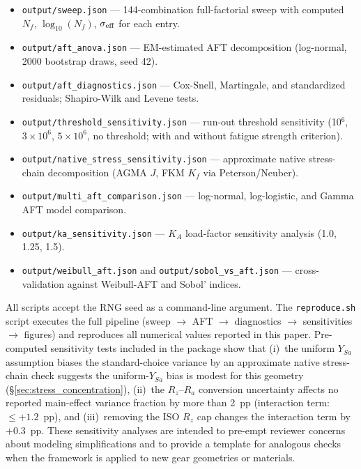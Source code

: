 \documentclass[twocolumn,12pt,a4paper]{article}
\begin{document}
\begin{itemize}
  \item \texttt{output/sweep.json} — 144-combination full-factorial
        sweep with computed $N_f$, $\log_{10}(N_f)$, $\sigma_{\rm
        eff}$ for each entry.
  \item \texttt{output/aft\_anova.json} — EM-estimated AFT
        decomposition (log-normal, 2000 bootstrap draws, seed 42).
  \item \texttt{output/aft\_diagnostics.json} — Cox-Snell, Martingale,
        and standardized residuals; Shapiro-Wilk and Levene tests.
  \item \texttt{output/\allowbreak threshold\_sensitivity\allowbreak .json} — run-out
        threshold sensitivity (10$^6$, $3\times10^6$, $5\times10^6$,
        no threshold; with and without fatigue strength criterion).
  \item \texttt{output/\allowbreak native\_stress\_sensitivity\allowbreak .json} —
        approximate native stress-chain decomposition (AGMA $J$,
        FKM $K_f$ via Peterson/Neuber).
  \item \texttt{output/multi\_aft\_comparison.json} — log-normal,
        log-logistic, and Gamma AFT model comparison.
  \item \texttt{output/ka\_sensitivity.json} — $K_A$ load-factor
        sensitivity analysis (1.0, 1.25, 1.5).
  \item \texttt{output/weibull\_aft.json} and
        \texttt{output/sobol\_vs\_aft.json} — cross-validation
        against Weibull-AFT and Sobol' indices.
\end{itemize}

All scripts accept the RNG seed as a command-line argument. The
\texttt{reproduce.sh} script executes the full pipeline
(sweep $\rightarrow$ AFT $\rightarrow$ diagnostics $\rightarrow$
sensitivities $\rightarrow$ figures) and reproduces all numerical
values reported in this paper. Pre-computed
sensitivity tests included in the package show that (i)~the
uniform $Y_{Sa}$ assumption biases the standard-choice variance by
an approximate native stress-chain check suggests the uniform-$Y_{Sa}$
bias is modest for this geometry (\S\ref{sec:stress_concentration}), (ii)~the
$R_z$--$R_a$ conversion uncertainty affects no reported main-effect
variance fraction by more than 2~pp (interaction term: $\leq +1.2$~pp), and (iii)~removing the ISO $R_z$ cap
changes the interaction term by $+0.3$~pp. These sensitivity analyses
are intended to pre-empt reviewer concerns about modeling
simplifications and to provide a template for analogous checks when
the framework is applied to new gear geometries or materials.
\end{document}
